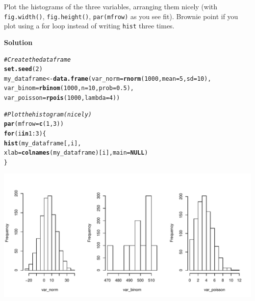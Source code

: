 \documentclass{article}\usepackage[]{graphicx}\usepackage[]{color}
\makeatletter
\def\maxwidth{ %
  \ifdim\Gin@nat@width>\linewidth
    \linewidth
  \else
    \Gin@nat@width
  \fi
}
\newcommand{\hlnum}[1]{\textcolor[rgb]{0.686,0.059,0.569}{#1}}%
\newcommand{\hlcom}[1]{\textcolor[rgb]{0.678,0.584,0.686}{\textit{#1}}}%
\newcommand{\hlopt}[1]{\textcolor[rgb]{0,0,0}{#1}}%
\newcommand{\hlstd}[1]{\textcolor[rgb]{0.345,0.345,0.345}{#1}}%
\newcommand{\hlkwa}[1]{\textcolor[rgb]{0.161,0.373,0.58}{\textbf{#1}}}%
\newcommand{\hlkwb}[1]{\textcolor[rgb]{0.69,0.353,0.396}{#1}}%
\newcommand{\hlkwc}[1]{\textcolor[rgb]{0.333,0.667,0.333}{#1}}%
\newcommand{\hlkwd}[1]{\textcolor[rgb]{0.737,0.353,0.396}{\textbf{#1}}}%
\newenvironment{kframe}{%
 \def\at@end@of@kframe{}%
 \ifinner\ifhmode%
  \def\at@end@of@kframe{\end{minipage}}%
  \begin{minipage}{\columnwidth}%
 \fi\fi%
 \def\FrameCommand##1{\hskip\@totalleftmargin \hskip-\fboxsep
 \colorbox{shadecolor}{##1}\hskip-\fboxsep
     \hskip-\linewidth \hskip-\@totalleftmargin \hskip\columnwidth}%
 \MakeFramed {\advance\hsize-\width
   \@totalleftmargin\z@ \linewidth\hsize
   \@setminipage}}%
 {\par\unskip\endMakeFramed%
 \at@end@of@kframe}
\newenvironment{knitrout}{}{} %
\makeatother
\begin{document}
Plot the histograms of the three variables, arranging them nicely (with \verb`fig.width()`, \verb`fig.height()`, \verb`par(mfrow)` as you see fit). Brownie point if you plot using a for loop instead of writing \verb`hist` three times.

\textbf{Solution}

\begin{knitrout}
\color{fgcolor}\begin{kframe}
\begin{alltt}
\hlcom{# Create the data frame}
\hlkwd{set.seed}\hlstd{(}\hlnum{2}\hlstd{)}
\hlstd{my_dataframe} \hlkwb{<-} \hlkwd{data.frame}\hlstd{(}\hlkwc{var_norm} \hlstd{=} \hlkwd{rnorm}\hlstd{(}\hlnum{1000}\hlstd{,} \hlkwc{mean} \hlstd{=} \hlnum{5}\hlstd{,} \hlkwc{sd} \hlstd{=} \hlnum{10}\hlstd{),}
                           \hlkwc{var_binom} \hlstd{=} \hlkwd{rbinom}\hlstd{(}\hlnum{1000}\hlstd{,} \hlkwc{n} \hlstd{=} \hlnum{10}\hlstd{,} \hlkwc{prob} \hlstd{=} \hlnum{0.5}\hlstd{),}
                           \hlkwc{var_poisson} \hlstd{=} \hlkwd{rpois}\hlstd{(}\hlnum{1000}\hlstd{,} \hlkwc{lambda} \hlstd{=} \hlnum{4}\hlstd{))}
\end{alltt}
\end{kframe}
\end{knitrout}

\begin{knitrout}
\color{fgcolor}\begin{kframe}
\begin{alltt}
\hlcom{# Plot the histogram (nicely)}
\hlkwd{par}\hlstd{(}\hlkwc{mfrow} \hlstd{=} \hlkwd{c}\hlstd{(}\hlnum{1}\hlstd{,} \hlnum{3}\hlstd{))}
\hlkwa{for} \hlstd{(i} \hlkwa{in} \hlnum{1}\hlopt{:}\hlnum{3}\hlstd{) \{}
  \hlkwd{hist}\hlstd{(my_dataframe[ , i],}
       \hlkwc{xlab} \hlstd{=} \hlkwd{colnames}\hlstd{(my_dataframe)[i],} \hlkwc{main} \hlstd{=} \hlkwa{NULL}\hlstd{)}
\hlstd{\}}
\end{alltt}
\end{kframe}
\includegraphics[width=\maxwidth]{figure/unnamed-chunk-2-1} 

\end{knitrout}
\end{document}
